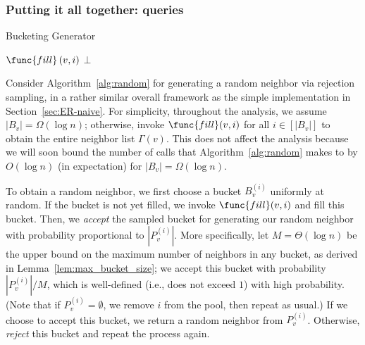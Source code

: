 \subsubsection{Putting it all together:  queries}
\label{sec:random_neighbor}

      \begin{algorithm}[H]
        \caption{Bucketing Generator}
        \begin{algorithmic}
    \Repeat
            \State$\func{fill}\left( v,i\right)$
        \EndIf
        \Else
        \EndIf
    \State \Return $\bot$
\EndProcedure
        \end{algorithmic}
\label{alg:random}
      \end{algorithm}

Consider Algorithm~\ref{alg:random} for generating a random neighbor via rejection sampling, in a rather similar overall framework as the simple implementation in Section~\ref{sec:ER-naive}.
For simplicity, throughout the analysis, we assume $|B_v| = \Omega(\log n)$; otherwise, invoke $\func{fill}(v,i)$ for all $i \in [|B_v|]$ to obtain the entire neighbor list $\Gamma(v)$. This does not affect the analysis because we will soon bound the number of calls that Algorithm~\ref{alg:random} makes to  by $O(\log n)$ (in expectation) for $|B_v| = \Omega(\log n)$.

To obtain a random neighbor, we first choose a bucket $B_v^{(i)}$ uniformly at random.
If the bucket is not yet filled, we invoke $\func{fill}(v,i)$ and fill this bucket.
Then, we \emph{accept} the sampled bucket for generating our random neighbor with probability proportional to $|P_v^{(i)}|$. More specifically, let $M = \Theta(\log n)$ be the upper bound on the maximum number of neighbors in any bucket, as derived in Lemma~\ref{lem:max_bucket_size}; we accept this bucket with probability $|P_v^{(i)}|/M$, which is well-defined (i.e., does not exceed $1$) with high probability. 
(Note that if $P_v^{(i)} = \emptyset$, we remove $i$ from the pool, then repeat as usual.) 
If we choose to accept this bucket, we return a random neighbor from $P_v^{(i)}$.
Otherwise, \emph{reject} this bucket and repeat the process again.


